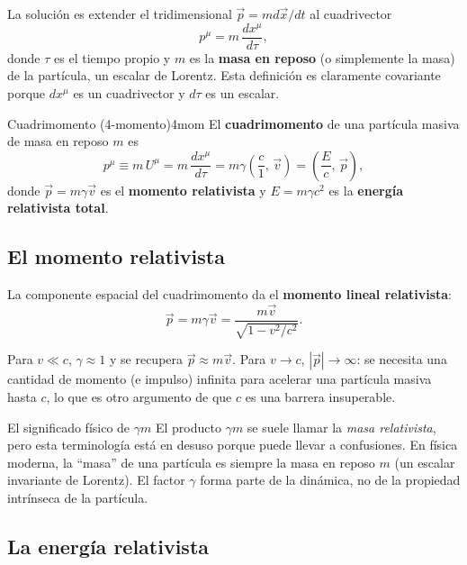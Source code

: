 La solución es extender el tridimensional $\vec{p} = md\vec{x}/dt$ al cuadrivector
\[
  p^\mu = m\,\frac{dx^\mu}{d\tau},
\]
donde $\tau$ es el tiempo propio y $m$ es la \textbf{masa en reposo} (o simplemente la masa) de la partícula, un escalar de Lorentz. Esta definición es claramente covariante porque $dx^\mu$ es un cuadrivector y $d\tau$ es un escalar.

\begin{definicion}{Cuadrimomento (4-momento)}{4mom}
El \textbf{cuadrimomento} de una partícula masiva de masa en reposo $m$ es
\begin{equation}
  p^\mu \equiv m\,U^\mu = m\,\frac{dx^\mu}{d\tau} = m\gamma\!\left(\frac{c}{1},\,\vec{v}\right)
  = \left(\frac{E}{c},\,\vec{p}\right),
  \label{eq:4mom}
\end{equation}
donde $\vec{p} = m\gamma\vec{v}$ es el \textbf{momento relativista} y $E = m\gamma c^2$ es la \textbf{energía relativista total}.
\end{definicion}

\subsection{El momento relativista}

La componente espacial del cuadrimomento da el \textbf{momento lineal relativista}:
\begin{equation}
  \vec{p} = m\gamma\vec{v} = \frac{m\vec{v}}{\sqrt{1 - v^2/c^2}}.
  \label{eq:momento_rel}
\end{equation}

Para $v \ll c$, $\gamma \approx 1$ y se recupera $\vec{p} \approx m\vec{v}$. Para $v \to c$, $|\vec{p}| \to \infty$: se necesita una cantidad de momento (e impulso) infinita para acelerar una partícula masiva hasta $c$, lo que es otro argumento de que $c$ es una barrera insuperable.

\begin{observacion}{El significado físico de $\gamma m$}{}
El producto $\gamma m$ se suele llamar la \emph{masa relativista}, pero esta terminología está en desuso porque puede llevar a confusiones. En física moderna, la ``masa'' de una partícula es siempre la masa en reposo $m$ (un escalar invariante de Lorentz). El factor $\gamma$ forma parte de la dinámica, no de la propiedad intrínseca de la partícula.
\end{observacion}

\subsection{La energía relativista}

